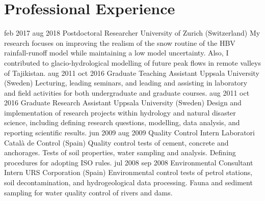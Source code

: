   \section{Professional Experience}
    \position
      {feb 2017 \textemdash{} aug 2018}
      {Postdoctoral Researcher}
      {University of Zurich (Switzerland)}
      {My research focuses on improving the realism of the snow routine of the HBV rainfall-runoff model while maintaining a low model uncertainty. Also, I contributed to glacio-hydrological modelling of future peak flows in remote valleys of Tajikistan.}
    \position
      {aug 2011 \textemdash{} oct 2016}
      {Graduate Teaching Assistant}
      {Uppsala University (Sweden)}
      {Lecturing, leading seminars, and leading and assisting in laboratory and field activities for both undergraduate and graduate courses.}
    \position
      {aug 2011 \textemdash{} oct 2016}
      {Graduate Research Assistant}
      {Uppsala University (Sweden)}
      {Design and implementation of research projects within hydrology and natural disaster science, including defining research questions, modelling, data analysis, and reporting scientific results.}
    \position
      {jun 2009 \textemdash{} aug 2009}
      {Quality Control Intern}
      {Laboratori Català de Control (Spain)}
      {Quality control tests of cement, concrete and anchorages. Tests of soil properties, water sampling and analysis. Defining procedures for adopting ISO rules.}
    \position
      {jul 2008 \textemdash{} sep 2008}
      {Environmental Consultant Intern}
      {URS Corporation (Spain)}
      {Environmental control tests of petrol stations, soil decontamination, and hydrogeological data processing. Fauna and sediment sampling for water quality control of rivers and dams.}
\fi
